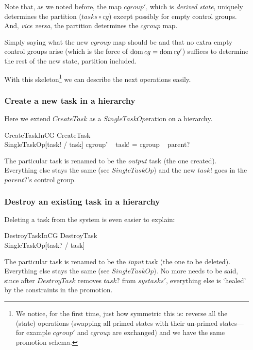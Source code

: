 \documentclass[a4paper,twoside,12pt]{article}
\begin{document}
Note that, as we noted before, the map $cgroup'$, which is \emph{derived state},
uniquely determines the partition ($tasks \circ cg$) except possibly for
empty control groups. And, \emph{vice versa}, the partition determines the $cgroup$ map.

Simply saying what the new $cgroup$ map should be and that no extra empty control groups arise
(which is the force of $\mathop{\mathrm{dom}} cg = \mathop{\mathrm{dom}} cg'$)
suffices to determine the rest of the new state, partition included.

With this skeleton\footnote{We notice, for the first time, just how symmetric this is:
reverse all the (state) operations (swapping all primed states with their un-primed states---for
example $cgroup'$ and $cgroup$ are exchanged) and we have the same promotion schema.}
we can describe the next operations easily.

\subsubsection{Create a new task in a hierarchy}

Here we extend $CreateTask$ as a $SingleTaskOp$eration on a hierarchy.

\begin{schema}{CreateTaskInCG}
CreateTask \\
SingleTaskOp[task! / task]
\where
cgroup' ~ task! = cgroup ~ parent?
\end{schema}
The particular task is renamed to be the \emph{output} task (the one created).
Everything else stays the same (see $SingleTaskOp$) and the new $task!$ goes in the $parent?$'s control group.

\subsubsection{Destroy an existing task in a hierarchy}

Deleting a task from the system is even easier to explain:

\begin{schema}{DestroyTaskInCG}
DestroyTask \\
SingleTaskOp[task? / task]
\end{schema}
The particular task is renamed to be the \emph{input} task (the one to be deleted).
Everything else stays the same (see $SingleTaskOp$).
No more needs to be said, since after $DestroyTask$ removes $task?$ from $systasks'$,
everything else is `healed' by the constraints in the promotion.
\end{document}
